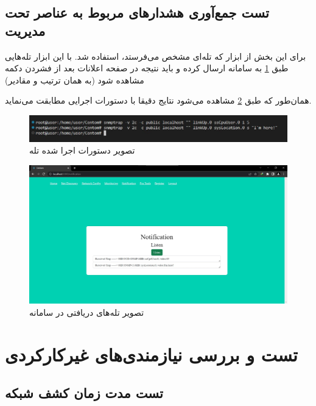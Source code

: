 \cleardoublepage


\subsection{تست جمع‌آوری هشدارهای مربوط به عناصر تحت مدیریت}

برای این بخش از ابزار  که تله‌ای مشخص می‌فرستد، استفاده شد. با این ابزار تله‌هایی طبق \cref{fig.55} به سامانه ارسال کرده و باید نتیجه در صفحه اعلانات بعد از فشردن دکمه مشاهده شود (به همان ترتیب و مقادیر)


همان‌طور که طبق \cref{fig.56} مشاهده می‌شود نتایج دقیقا با دستورات اجرایی مطابقت می‌نماید.


\begin{figure}[!h]
    \centering\includegraphics[scale=.70]{./trap-before}
    \caption{تصویر دستورات اجرا شده تله}\label{fig.55}
\end{figure}

\begin{figure}[!h]
    \centering\includegraphics[scale=.38]{./notification}
    \caption{تصویر تله‌های دریافتی در سامانه}\label{fig.56}
\end{figure}

\cleardoublepage

\section{تست و بررسی نیازمندی‌های غیرکارکردی}


\subsection{تست مدت زمان کشف شبکه}

